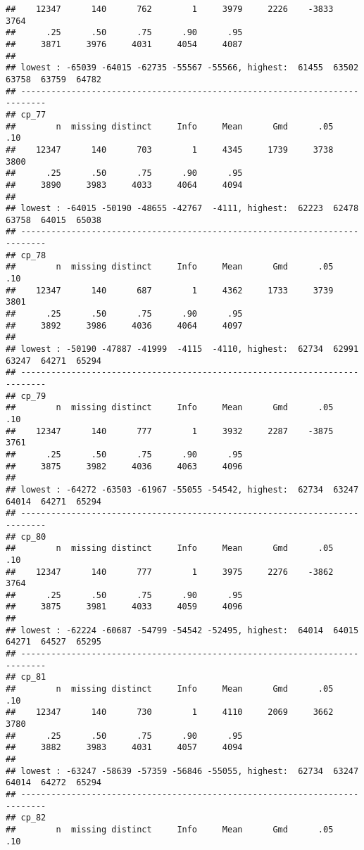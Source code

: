 \documentclass[]{article}
\begin{document}
\begin{verbatim}
##    12347      140      762        1     3979     2226    -3833     3764 
##      .25      .50      .75      .90      .95 
##     3871     3976     4031     4054     4087 
## 
## lowest : -65039 -64015 -62735 -55567 -55566, highest:  61455  63502  63758  63759  64782
## ---------------------------------------------------------------------------
## cp_77 
##        n  missing distinct     Info     Mean      Gmd      .05      .10 
##    12347      140      703        1     4345     1739     3738     3800 
##      .25      .50      .75      .90      .95 
##     3890     3983     4033     4064     4094 
## 
## lowest : -64015 -50190 -48655 -42767  -4111, highest:  62223  62478  63758  64015  65038
## ---------------------------------------------------------------------------
## cp_78 
##        n  missing distinct     Info     Mean      Gmd      .05      .10 
##    12347      140      687        1     4362     1733     3739     3801 
##      .25      .50      .75      .90      .95 
##     3892     3986     4036     4064     4097 
## 
## lowest : -50190 -47887 -41999  -4115  -4110, highest:  62734  62991  63247  64271  65294
## ---------------------------------------------------------------------------
## cp_79 
##        n  missing distinct     Info     Mean      Gmd      .05      .10 
##    12347      140      777        1     3932     2287    -3875     3761 
##      .25      .50      .75      .90      .95 
##     3875     3982     4036     4063     4096 
## 
## lowest : -64272 -63503 -61967 -55055 -54542, highest:  62734  63247  64014  64271  65294
## ---------------------------------------------------------------------------
## cp_80 
##        n  missing distinct     Info     Mean      Gmd      .05      .10 
##    12347      140      777        1     3975     2276    -3862     3764 
##      .25      .50      .75      .90      .95 
##     3875     3981     4033     4059     4096 
## 
## lowest : -62224 -60687 -54799 -54542 -52495, highest:  64014  64015  64271  64527  65295
## ---------------------------------------------------------------------------
## cp_81 
##        n  missing distinct     Info     Mean      Gmd      .05      .10 
##    12347      140      730        1     4110     2069     3662     3780 
##      .25      .50      .75      .90      .95 
##     3882     3983     4031     4057     4094 
## 
## lowest : -63247 -58639 -57359 -56846 -55055, highest:  62734  63247  64014  64272  65294
## ---------------------------------------------------------------------------
## cp_82 
##        n  missing distinct     Info     Mean      Gmd      .05      .10 

\end{verbatim}
\end{document}
